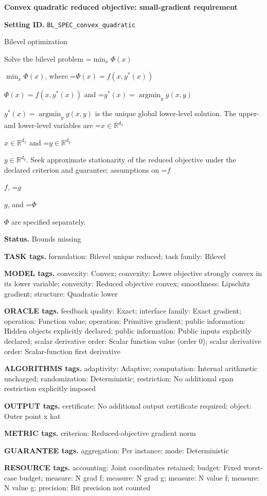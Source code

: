 \documentclass[10pt,a4paper]{article}
\newcommand{\AtlasMath}[1]{\par\begingroup\centering\setbox0=\hbox{$\displaystyle #1$}\ifdim\wd0>1.4\linewidth\typeout{ATLAS WIDE FORMULA: \the\wd0}\fi\ifdim\wd0>\linewidth\resizebox{\linewidth}{!}{\box0}\else\box0\fi\par\endgroup}
\newcommand{\AtlasInlineMath}[1]{\begingroup\setbox0=\hbox{$#1$}\ifdim\wd0>.4\linewidth\endgroup\AtlasMath{#1}\else\endgroup$#1$\fi}
\begin{document}
\raggedright

{\LARGE\bfseries\sffamily\color{AtlasNavy} Convex quadratic reduced objective: small-gradient requirement\par}\vspace{5pt}
\textbf{Setting ID.} \texttt{BL\_\allowbreak{}SPEC\_\allowbreak{}convex\_\allowbreak{}quadratic}

Bilevel optimization

Solve the bilevel problem \AtlasInlineMath{\min_x\Phi(x)}, where \AtlasInlineMath{\Phi(x)=f(x,y^*(x))} and \AtlasInlineMath{y^*(x)=\operatorname*{argmin}_y g(x,y)} is the unique global lower-level solution. The upper- and lower-level variables are \AtlasInlineMath{x\in\mathbb{R}^{d_x}} and \AtlasInlineMath{y\in\mathbb{R}^{d_y}}. Seek approximate stationarity of the reduced objective under the declared criterion and guarantee; assumptions on \AtlasInlineMath{f}, \AtlasInlineMath{g}, and \AtlasInlineMath{\Phi} are specified separately.

\textbf{Status.} Bounds missing

\textbf{TASK tags.} formulation: Bilevel unique reduced; task family: Bilevel

\textbf{MODEL tags.} convexity: Convex; convexity: Lower objective strongly convex in its lower variable; convexity: Reduced objective convex; smoothness: Lipschitz gradient; structure: Quadratic lower

\textbf{ORACLE tags.} feedback quality: Exact; interface family: Exact gradient; operation: Function value; operation: Primitive gradient; public information: Hidden objects explicitly declared; public information: Public inputs explicitly declared; scalar derivative order: Scalar function value (order 0); scalar derivative order: Scalar-function first derivative

\textbf{ALGORITHMS tags.} adaptivity: Adaptive; computation: Internal arithmetic uncharged; randomization: Deterministic; restriction: No additional span restriction explicitly imposed

\textbf{OUTPUT tags.} certificate: No additional output certificate required; object: Outer point x hat

\textbf{METRIC tags.} criterion: Reduced-objective gradient norm

\textbf{GUARANTEE tags.} aggregation: Per instance; mode: Deterministic

\textbf{RESOURCE tags.} accounting: Joint coordinates retained; budget: Fixed worst-case budget; measure: N grad f; measure: N grad g; measure: N value f; measure: N value g; precision: Bit precision not counted
\end{document}
